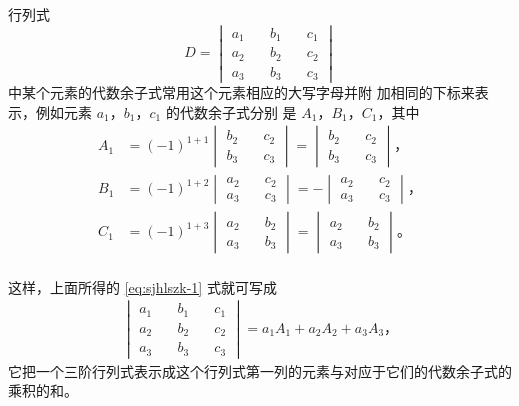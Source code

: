 行列式
$$
D = \begin{vmatrix*}
    a_1 \quad & b_1 \quad & c_1 \\
    a_2 \quad & b_2 \quad & c_2 \\
    a_3 \quad & b_3 \quad & c_3
\end{vmatrix*}
$$
中某个元素的代数余子式常用这个元素相应的大写字母并附
加相同的下标来表示，例如元素 $a_1$，$b_1$，$c_1$ 的代数余子式分别
是 $A_1$，$B_1$，$C_1$，其中
\begin{align*}
    A_1 &= (-1)^{1+1}
            \begin{vmatrix}
                b_2 \quad & c_2 \\
                b_3 \quad & c_3
            \end{vmatrix}
        =   \begin{vmatrix}
                b_2 \quad & c_2 \\
                b_3 \quad & c_3
            \end{vmatrix} \text{，} \\
    B_1 &= (-1)^{1+2}
            \begin{vmatrix}
                a_2 \quad & c_2 \\
                a_3 \quad & c_3
            \end{vmatrix}
        = - \begin{vmatrix}
                a_2 \quad & c_2 \\
                a_3 \quad & c_3
            \end{vmatrix} \text{，} \\
    C_1 &= (-1)^{1+3}
            \begin{vmatrix}
                a_2 \quad & b_2 \\
                a_3 \quad & b_3
            \end{vmatrix}
        =   \begin{vmatrix}
                a_2 \quad & b_2 \\
                a_3 \quad & b_3
            \end{vmatrix} \text{。} \\
\end{align*}

这样，上面所得的 \eqref{eq:sjhlszk-1} 式就可写成
\begin{gather*}
    \begin{vmatrix*}
        a_1 \quad & b_1 \quad & c_1 \\
        a_2 \quad & b_2 \quad & c_2 \\
        a_3 \quad & b_3 \quad & c_3
    \end{vmatrix*} = a_1A_1 + a_2A_2 + a_3A_3 \text{，} \tag{2}\label{eq:sjhlszk-2}
\end{gather*}
它把一个三阶行列式表示成这个行列式第一列的元素与对应于它们的代数余子式的乘积的和。

